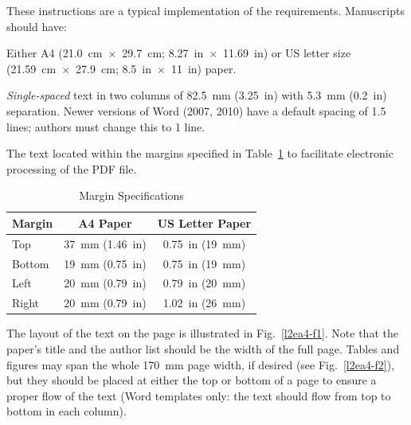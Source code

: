 \documentclass[acus]{jacow}
\begin{document}
These instructions are a typical implementation of the
requirements. Manuscripts should have:
\begin{Itemize}
    \item  Either A4 (\SI{21.0}{cm}~$\times$~\SI{29.7}{cm}; \SI{8.27}{in}~$\times$~\SI{11.69}{in}) or US
           letter size (\SI{21.59}{cm}~$\times$~\SI{27.9}{cm}; \SI{8.5}{in}~$\times$~\SI{11}{in}) paper.
    \item  \textit{Single-spaced} text in two columns of \SI{82.5}{mm} (\SI{3.25}{in}) with \SI{5.3}{mm}
           (\SI{0.2}{in}) separation. Newer versions of Word (2007, 2010) have a default spacing
           of 1.5 lines; authors must change this to 1 line.
    \item  The text located within the margins specified in Table~\ref{l2ea4-t1}
           to facilitate electronic processing of the PDF file.
\end{Itemize}
\begin{table}[hbt]
   \centering
   \caption{Margin Specifications}
   \begin{tabular}{lcc}
       \toprule
       \textbf{Margin} & \textbf{A4 Paper}                      & \textbf{US Letter Paper} \\
       \midrule
           Top         & \SI{37}{mm} (\SI{1.46}{in})            & \SI{0.75}{in} (\SI{19}{mm})        \\
          Bottom       & \SI{19}{mm} (\SI{0.75}{in})            & \SI{0.75}{in} (\SI{19}{mm})        \\
           Left        & \SI{20}{mm} (\SI{0.79}{in})            & \SI{0.79}{in} (\SI{20}{mm})        \\
           Right       & \SI{20}{mm} (\SI{0.79}{in})            & \SI{1.02}{in} (\SI{26}{mm})        \\
       \bottomrule
   \end{tabular}
   \label{l2ea4-t1}
\end{table}

The layout of the text on the page is illustrated in
Fig.~\ref{l2ea4-f1}. Note that the paper's title and the author list should be
the width of the full page. Tables and figures may span the whole \SI{170}{mm} page width,
if desired (see Fig.~\ref{l2ea4-f2}), but they should be placed at
either the top or bottom of a page to ensure a proper flow of the text
(Word templates only: the text should flow from top to bottom in each column).
\end{document}
